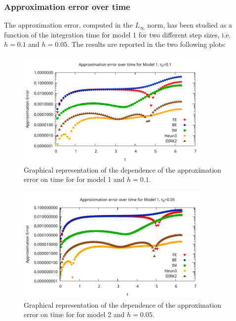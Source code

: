 \documentclass[11pt]{article}
\theoremstyle{theorem}
\theoremstyle{definition}
\begin{document}
\subsubsection{Approximation error over time}
The approximation error, computed in the $L_\infty$ norm, has been studied as a function of the integration time for model 1 for two different step sizes, i.e. $h=0.1$ and $h=0.05$. The results are reported in the two following plots:

\begin{figure}[H]
	\begin{center}
		\includegraphics[width=0.85\textwidth]{Err_vs_t_1}
	\end{center}
	\caption{Graphical representation of the dependence of the approximation error on time for for model 1 and $h=0.1$.
		\label{fig:Err_vs_t_0_1}}
\end{figure}

\begin{figure}[H]
	\begin{center}
		\includegraphics[width=0.85\textwidth]{Err_vs_t_05}
	\end{center}
	\caption{Graphical representation of the dependence of the approximation error on time for for model 2 and $h=0.05$.
		\label{fig:Err_vs_t_0_05}}
\end{figure}
\end{document}
